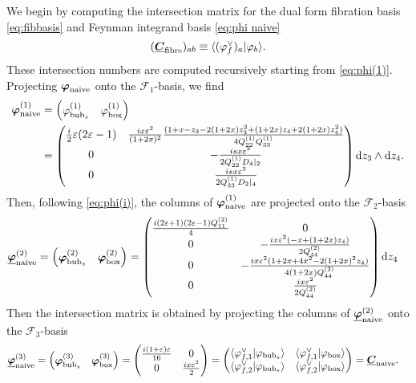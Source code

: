 \documentclass[11pt]{article}
\renewcommand{\d}{\text{d}}
\newcommand{\nn}{\nonumber}
\newcommand{\be}{\begin{equation}}
\newcommand{\ee}{\end{equation}}
\newcommand{\la}{\langle}
\newcommand{\ra}{\rangle}
\newcommand{\F}{\mathcal{F}}
\newcommand{\vphi}{\varphi}
\newcommand{\vep}{\varepsilon}
\newcommand{\bs}[1]{\boldsymbol{#1}}
\newcommand{\mat}[1]{\underline{\boldsymbol{#1}}}
\begin{document}
We begin by computing the intersection matrix for the dual form fibration basis \eqref{eq:fibbasis} and Feynman integrand basis \eqref{eq:phi naive}
\be
	(\mat{C}_{\rm fibre})_{ab} \equiv \la (\vphi^\vee_f)_a \vert \vphi_b \ra.
\ee
These intersection numbers are computed recursively starting from \eqref{eq:phi(1)}. Projecting $\bs{\vphi}_{\rm naive}$ onto the $\F_1$-basis, we find
\begin{align}
	\bs{\vphi}^{(1)}_{\rm naive}  &= 
	\begin{pmatrix}
		\vphi^{(1)}_{{\rm bub}_s}
		&
		\vphi^{(1)}_{{\rm box}}
	\end{pmatrix}
	\nn \\
	&= \begin{pmatrix}
		\frac{i}{2} \vep (2\vep-1)
		& \frac{ix\vep^2}{(1+2x)^2}
		\frac{
				 (1{+}x {-} z_3 - 2(1{+}2x) z_3^2 {+} (1{+}2x) z_4 {+} 2(1{+}2x) z_4^2)
			}{
				4Q^{(1)}_{22}Q^{(1)}_{33}
			}
		\\
		0 & -\frac{isx\vep^2}{2 Q^{(1)}_{22} D_4\vert_2}
		\\ 
		0 & \frac{isx\vep^2}{2 Q^{(1)}_{33} D_2\vert_4}
	\end{pmatrix} \d z_3 \wedge \d z_4 .
	\label{eq:phi0}
\end{align}
Then, following \eqref{eq:phi(i)}, the columns of $\bs{\vphi}^{(1)}_{\rm naive}$ are projected onto the $\F_2$-basis 
\begin{align}
	\mat{\vphi}^{(2)}_{\rm naive}  &= 
	\begin{pmatrix}
		\bs{\vphi}^{(2)}_{{\rm bub}_s}
		&
		\bs{\vphi}^{(2)}_{{\rm box}}
	\end{pmatrix}
	 = \begin{pmatrix}
		\frac{i(2\vep+1) (2\vep-1) Q^{(2)}_{11} }{4} & 0 
		\\
		0 & -\frac{ix \vep^2(-x{+}(1{+}2x) z_4)}{2Q^{(2)}_{44}}
		\\
		0 & -\frac{ix \vep^2 (1{+}2x{+}4x^2{-}2(1{+}2x)^2 z_4)}{4 (1{+}2x) Q^{(2)}_{44}}
		\\
		0 & \frac{ix\vep^2}{2 Q^{(2)}_{44}}
	\end{pmatrix} \d z_4
\end{align}
Then the intersection matrix is obtained by projecting the columns of $\mat{\vphi}^{(2)}_{\rm naive}$ onto the $\F_3$-basis 
\begin{align}
	\mat{\vphi}^{(3)}_{\rm naive}  &= 
	\begin{pmatrix}
		\bs{\vphi}^{(3)}_{{\rm bub}_s}
		&
		\bs{\vphi}^{(3)}_{{\rm box}}
	\end{pmatrix}
	 =
	 \begin{pmatrix}
		\frac{i(1+\vep)\vep}{16} & 0 
		\\
		0 & \frac{ix \vep^2}{2}
	\end{pmatrix}
	=\begin{pmatrix}
		\la \vphi^\vee_{f,1} \vert \vphi_{{\rm bub}_s} \ra  
			& \la \vphi^\vee_{f,1} \vert \vphi_{{\rm box}} \ra  
		\\
		\la \vphi^\vee_{f,2} \vert \vphi_{{\rm bub}_s} \ra  
			& \la \vphi^\vee_{f,2} \vert \vphi_{{\rm box}} \ra 
	\end{pmatrix}
	=\mat{C}_{\rm naive}.
	\label{eq:Cnaive}
\end{align}
\end{document}
